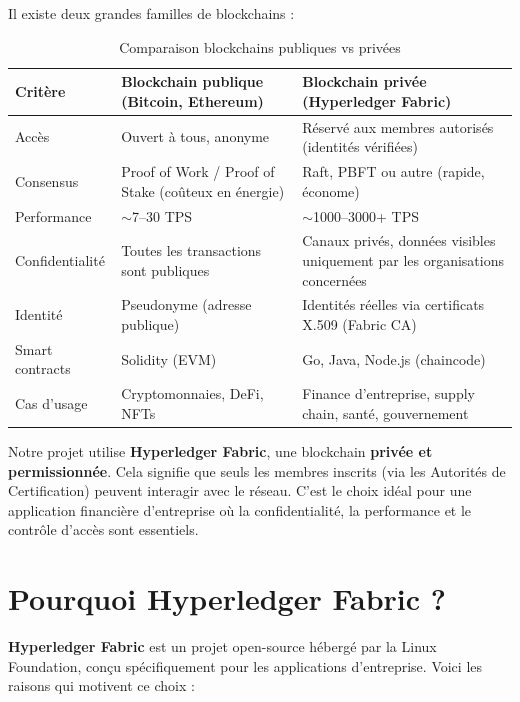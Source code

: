 \documentclass[12pt,a4paper,twoside]{report}
\begin{document}
Il existe deux grandes familles de blockchains :

\begin{table}[H]
\centering
\begin{tabularx}{\textwidth}{lXX}
\toprule
\textbf{Critère} & \textbf{Blockchain publique} (Bitcoin, Ethereum) & \textbf{Blockchain privée} (Hyperledger Fabric) \\
\midrule
Accès & Ouvert à tous, anonyme & Réservé aux membres autorisés (identités vérifiées) \\
Consensus & Proof of Work / Proof of Stake (coûteux en énergie) & Raft, PBFT ou autre (rapide, économe) \\
Performance & $\sim$7--30 TPS & $\sim$1000--3000+ TPS \\
Confidentialité & Toutes les transactions sont publiques & Canaux privés, données visibles uniquement par les organisations concernées \\
Identité & Pseudonyme (adresse publique) & Identités réelles via certificats X.509 (Fabric CA) \\
Smart contracts & Solidity (EVM) & Go, Java, Node.js (chaincode) \\
Cas d'usage & Cryptomonnaies, DeFi, NFTs & Finance d'entreprise, supply chain, santé, gouvernement \\
\bottomrule
\end{tabularx}
\caption{Comparaison blockchains publiques vs privées}
\end{table}

\begin{warningbox}
Notre projet utilise \textbf{Hyperledger Fabric}, une blockchain \textbf{privée et permissionnée}. Cela signifie que seuls les membres inscrits (via les Autorités de Certification) peuvent interagir avec le réseau. C'est le choix idéal pour une application financière d'entreprise où la confidentialité, la performance et le contrôle d'accès sont essentiels.
\end{warningbox}

\section{Pourquoi Hyperledger Fabric ?}

\textbf{Hyperledger Fabric} est un projet open-source hébergé par la Linux Foundation, conçu spécifiquement pour les applications d'entreprise. Voici les raisons qui motivent ce choix :
\end{document}
